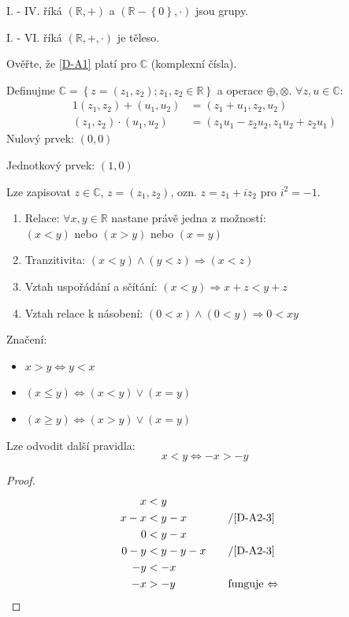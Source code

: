 I. - IV. říká $(\mathbb{R}, +)$ a $(\mathbb{R} - \left\{0\right\}, \cdot)$ jsou grupy.

I. - VI. říká $(\mathbb{R}, +, \cdot)$ je těleso.

Ověřte, že \autoref{D-A1} platí pro $\mathbb{C}$ (komplexní čísla).

\begin{example}
	Definujme $\mathbb{C} = \left\{z = (z_1, z_2); z_1, z_2 \in \mathbb{R}\right\}$ a
		operace $\oplus, \otimes$. $\forall z, u \in \mathbb{C}:$
	\begin{alignat}{1}
		(z_1, z_2) + (u_1, u_2) &= (z_1 + u_1, z_2, u_2) \\
		(z_1, z_2) \cdot (u_1, u_2) &= (z_1u_1 - z_2u_2, z_1u_2 + z_2u_1)
	\end{alignat}
	Nulový prvek: $(0, 0)$
	
	Jednotkový prvek: $(1, 0)$

	Lze zapisovat $z\in \mathbb{C}$, $z = (z_1, z_2)$, ozn. $z = z_1 + iz_2$ pro $i^2 = -1$.
\end{example}
\begin{definitionAi}[Uspořádání]\noindent\label{D-A2}
	\begin{enumerate}[I]
		\item Relace: $\forall x, y \in \mathbb{R}$ nastane právě jedna z možností: \\
		$(x<y)$ nebo $(x>y)$ nebo $(x=y)$
		\item Tranzitivita: $(x<y) \land (y<z) \Rightarrow (x<z)$
		\item\label{D-A2-3} Vztah uspořádání a sčítání: $(x<y) \Rightarrow x+z < y+z$
		\item\label{D-A2-4} Vztah relace k násobení: $(0<x) \land (0<y) \Rightarrow 0 < xy$
	\end{enumerate}
\end{definitionAi}

Značení:
\begin{itemize}
	\item $x>y \Leftrightarrow y<x$
	\item $(x\leq y) \Leftrightarrow (x<y) \lor (x=y)$
	\item $(x\geq y) \Leftrightarrow (x>y) \lor (x=y)$
\end{itemize}

Lze odvodit další pravidla:
\begin{equation}\label{RelationsOfNegatives}
	x<y \Leftrightarrow -x > -y
\end{equation}
\begin{proof}
	\begin{alignat*}{2}
		x&<y \\
		x-x&<y-x &&\text{\quad /\autoref{D-A2-3}} \\
		0&<y-x \\
		0-y&<y-y-x &&\text{\quad /\autoref{D-A2-3}} \\
		-y&<-x \\
		-x&>-y &&\text{\quad funguje $\Leftrightarrow$}
	\end{alignat*}
\end{proof}

